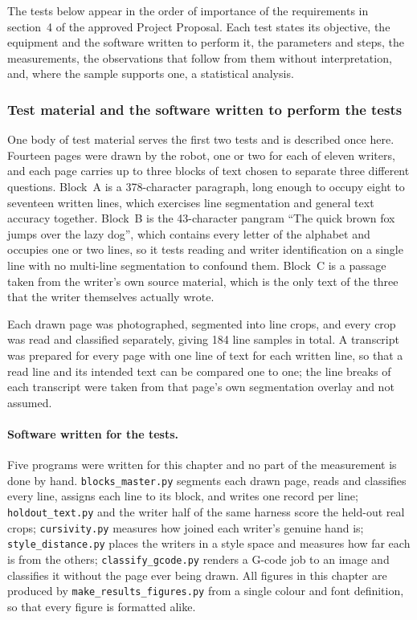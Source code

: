 The tests below appear in the order of importance of the requirements in
section~4 of the approved Project Proposal. Each test states its objective, the
equipment and the software written to perform it, the parameters and steps, the
measurements, the observations that follow from them without interpretation,
and, where the sample supports one, a statistical analysis.

\subsubsection{Test material and the software written to perform the tests}
\label{sec:res-material}

One body of test material serves the first two tests and is described once
here. Fourteen pages were drawn by the robot, one or two for each of eleven
writers, and each page carries up to three blocks of text chosen to separate
three different questions. Block~A is a 378-character paragraph, long enough to
occupy eight to seventeen written lines, which exercises line segmentation and
general text accuracy together. Block~B is the 43-character pangram ``The quick
brown fox jumps over the lazy dog'', which contains every letter of the
alphabet and occupies one or two lines, so it tests reading and writer
identification on a single line with no multi-line segmentation to confound
them. Block~C is a passage taken from the writer's own source material, which is
the only text of the three that the writer themselves actually wrote.

Each drawn page was photographed, segmented into line crops, and every crop was
read and classified separately, giving 184 line samples in total. A transcript
was prepared for every page with one line of text for each written line, so
that a read line and its intended text can be compared one to one; the line
breaks of each transcript were taken from that page's own segmentation overlay
and not assumed.

\paragraph{Software written for the tests.}
Five programs were written for this chapter and no part of the measurement is
done by hand.
\texttt{blocks\_master.py} segments each drawn page, reads and classifies every
line, assigns each line to its block, and writes one record per line;
\texttt{holdout\_text.py} and the writer half of the same harness score the
held-out real crops;
\texttt{cursivity.py} measures how joined each writer's genuine hand is;
\texttt{style\_distance.py} places the writers in a style space and measures
how far each is from the others;
\texttt{classify\_gcode.py} renders a G-code job to an image and classifies it
without the page ever being drawn.
All figures in this chapter are produced by \texttt{make\_results\_figures.py}
from a single colour and font definition, so that every figure is formatted
alike.

